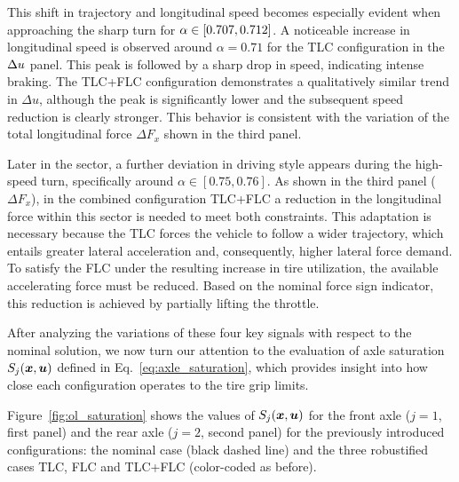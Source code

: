 This shift in trajectory and longitudinal speed becomes especially evident when approaching the sharp turn for $\alpha \in [0.707, 0.712]$. A noticeable increase in longitudinal speed is observed around $\alpha = 0.71$ for the TLC configuration  in the $\Delta u$ panel. This peak is followed by a sharp drop in speed, indicating intense braking.
The TLC+FLC configuration demonstrates a qualitatively similar trend in $\Delta u$, although the peak is significantly lower and the subsequent speed reduction is clearly stronger. This behavior is consistent with the variation of the total longitudinal force $\Delta F_x$ shown in the third panel.


Later in the sector, a further deviation in driving style appears during the high-speed turn, specifically around $\alpha \in [0.75, 0.76]$.
As shown in the third panel ($\Delta F_x$), in the combined configuration TLC+FLC a reduction in the longitudinal force within this sector is needed to meet both constraints.
This adaptation is necessary because the TLC forces the vehicle to follow a wider trajectory, which entails greater lateral acceleration and, consequently, higher lateral force demand. To satisfy the FLC under the resulting increase in tire utilization, the available accelerating force must be reduced.
Based on the nominal force sign indicator, this reduction is achieved by partially lifting the throttle.

After analyzing the variations of these four key signals with respect to the nominal solution, we now turn our attention to the evaluation of axle saturation $S_j(\boldsymbol{x},\boldsymbol{u})$ defined in Eq.~\eqref{eq:axle_saturation}, which provides insight into how close each configuration operates to the tire grip limits.

Figure~\ref{fig:ol_saturation} shows the values of $S_j(\boldsymbol{x},\boldsymbol{u})$ for the front axle ($j=1$, first panel) and the rear axle ($j=2$, second panel) for the previously introduced configurations: the nominal case (black dashed line) and the three robustified cases TLC, FLC and TLC+FLC (color-coded as before).

